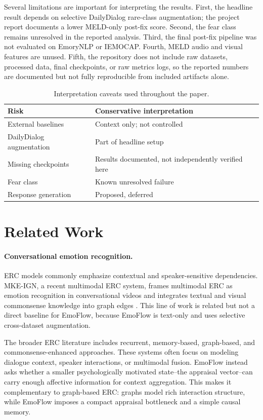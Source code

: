 \documentclass[11pt]{article}
\begin{document}
Several limitations are important for interpreting the results. First, the headline result depends on selective DailyDialog rare-class augmentation; the project report documents a lower MELD-only post-fix score. Second, the fear class remains unresolved in the reported analysis. Third, the final post-fix pipeline was not evaluated on EmoryNLP or IEMOCAP. Fourth, MELD audio and visual features are unused. Fifth, the repository does not include raw datasets, processed data, final checkpoints, or raw metrics logs, so the reported numbers are documented but not fully reproducible from included artifacts alone.

\begin{table}[t]
\centering
\scriptsize
\begin{tabular}{p{2.1cm}p{4.8cm}}
\toprule
Risk & Conservative interpretation \\
\midrule
External baselines & Context only; not controlled \\
DailyDialog augmentation & Part of headline setup \\
Missing checkpoints & Results documented, not independently verified here \\
Fear class & Known unresolved failure \\
Response generation & Proposed, deferred \\
\bottomrule
\end{tabular}
\caption{Interpretation caveats used throughout the paper.}
\label{tab:caveats}
\end{table}

\section{Related Work}

\paragraph{Conversational emotion recognition.}
ERC models commonly emphasize contextual and speaker-sensitive dependencies. MKE-IGN, a recent multimodal ERC system, frames multimodal ERC as emotion recognition in conversational videos and integrates textual and visual commonsense knowledge into graph edges \citep{tu2024mkeign}. This line of work is related but not a direct baseline for EmoFlow, because EmoFlow is text-only and uses selective cross-dataset augmentation.

The broader ERC literature includes recurrent, memory-based, graph-based, and commonsense-enhanced approaches. These systems often focus on modeling dialogue context, speaker interactions, or multimodal fusion. EmoFlow instead asks whether a smaller psychologically motivated state--the appraisal vector--can carry enough affective information for context aggregation. This makes it complementary to graph-based ERC: graphs model rich interaction structure, while EmoFlow imposes a compact appraisal bottleneck and a simple causal memory.
\end{document}
